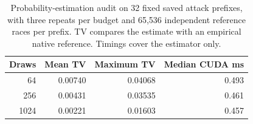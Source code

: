 \begin{table}[ht]\centering\small
\begin{tabular}{rrrr}\toprule
Draws & Mean TV & Maximum TV & Median CUDA ms\\\midrule
64 & 0.00740 & 0.04068 & 0.493\\
256 & 0.00431 & 0.03535 & 0.461\\
1024 & 0.00221 & 0.01603 & 0.457\\
\bottomrule\end{tabular}
\caption{Probability-estimation audit on 32 fixed saved attack prefixes, with three repeats per budget and 65,536 independent reference races per prefix. TV compares the estimate with an empirical native reference. Timings cover the estimator only.}
\end{table}
